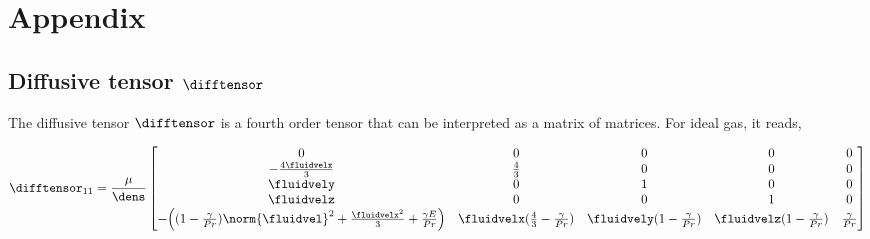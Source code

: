 \documentclass[../main.tex]{subfiles}
\begin{document}
\setlength{\delimitershortfall}{0pt}

\section{Appendix}

\subsection{Diffusive tensor $\difftensor$}

The diffusive tensor $\difftensor$ is a fourth order tensor that can be interpreted as a matrix of matrices.
For ideal gas, it reads,

\def\koo{-\frac{4 \fluidvelx}{3} }
\def\ktt{ \frac{4}{3} }
\def\keo{ \fluidvely }
\def\kee{ 1 }
\def\kao{ \fluidvelz }
\def\kaa{ 1 }
\def\kto{ -\frac{4\fluidvelx}{3} }

\def\kso{ -\Big((1-\frac{\gamma}{Pr})\norm{\fluidvel}^2+\frac{\fluidvelx^2}{3}+\frac{\gamma E}{Pr} \Big) }
\def\kst{ \fluidvelx(\frac{4}{3}-\frac{\gamma}{Pr}) }
\def\kse{ \fluidvely(1-\frac{\gamma}{Pr}) }
\def\ksa{ \fluidvelz(1-\frac{\gamma}{Pr}) }
\def\kss{ \frac{\gamma}{Pr} }
\begin{align}\nonumber
\difftensor_{11}=\frac{\mu}{\dens}
\begin{bmatrix}
  0     &    0     &    0     &    0     &    0     \\
  \kto  &    \ktt  &    0     &    0     &    0     \\
  \keo  &    0     &    \kee  &    0     &    0     \\
  \kao  &    0     &    0     &    \kaa  &    0     \\
  \kso  &    \kst  &    \kse  &    \ksa  &    \kss  \\
\end{bmatrix}
\end{align}
\end{document}
